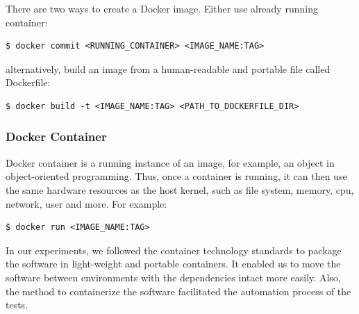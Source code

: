 \skippara There are two ways to create a Docker image. Either use already running container:
\begin{lstlisting}[numbers=none, frame=single]
  $ docker commit <RUNNING_CONTAINER> <IMAGE_NAME:TAG>
\end{lstlisting}

\skippara alternatively, build an image from a human-readable and portable file called Dockerfile:
\begin{lstlisting}[numbers=none, frame=single]
  $ docker build -t <IMAGE_NAME:TAG> <PATH_TO_DOCKERFILE_DIR>
\end{lstlisting}

\clearpage
\subsubsection{Docker Container}
Docker container is a running instance of an image, for example, an object in object-oriented programming.
Thus, once a container is running, it can then use the same hardware resources as the host kernel, such as file system, memory, \acrshort{cpu}, network, user and more.
For example:
\begin{lstlisting}[numbers=none, frame=single]
  $ docker run <IMAGE_NAME:TAG>
\end{lstlisting}

\skippara In our experiments, we followed the container technology standards to package the software in light-weight and portable containers.
It enabled us to move the software between environments with the dependencies intact more easily.
Also, the method to containerize the software facilitated the automation process of the tests.
